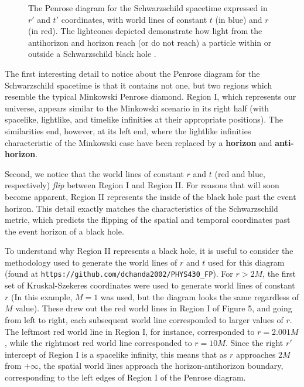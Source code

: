 \documentclass{article}
\begin{document}
\begin{figure}[ht]
\begin{center}
\end{center}



\vspace{-40pt}
\caption{The Penrose diagram for the Schwarzschild spacetime expressed in $r'$ and $t'$ coordinates, with world lines of constant $t$ (in blue) and $r$ (in red). The lightcones depicted demonstrate how light from the antihorizon and horizon reach (or do not reach) a particle within or outside a Schwarzschild black hole \cite{anti_horizon}.}
\label{fig:penrose_schwarz}
\end{figure}

The first interesting detail to notice about the Penrose diagram for the Schwarzschild spacetime is that it contains not one, but two regions which resemble the typical Minkowski Penrose diamond. Region I, which represents our universe, appears similar to the Minkowski scenario in its right half (with spacelike, lightlike, and timelike infinities at their appropriate positions). The similarities end, however, at its left end, where the lightlike infinities characteristic of the Minkowski case have been replaced by a \textbf{horizon} and \textbf{anti-horizon}.

Second, we notice that the world lines of constant $r$ and $t$ (red and blue, respectively) \textit{flip} between Region I and Region II. For reasons that will soon become apparent, Region II represents the inside of the black hole past the event horizon. This detail exactly matches the characteristics of the Schwarzschild metric, which predicts the flipping of the spatial and temporal coordinates past the event horizon of a black hole.

To understand why Region II represents a black hole, it is useful to consider the methodology used to generate the world lines of $r$ and $t$ used for this diagram (found at \texttt{https://github.com/dchanda2002/PHYS430_FP}). For $r>2M$, the first set of Kruskal-Szekeres coordinates were used to generate world lines of constant $r$ (In this example, $M=1$ was used, but the diagram looks the same regardless of $M$ value). These drew out the red world lines in Region I of Figure 5, and going from left to right, each subsequent world line corresponded to larger values of $r$. The leftmost red world line in Region I, for instance, corresponded to $r=2.001M$, while the rightmost red world line corresponded to $r=10M$. Since the right $r'$ intercept of Region I is a spacelike infinity, this means that as $r$ approaches $2M$ from $+\infty$, the spatial world lines approach the horizon-antihorizon boundary, corresponding to the left edges of Region I of the Penrose diagram.
\end{document}
